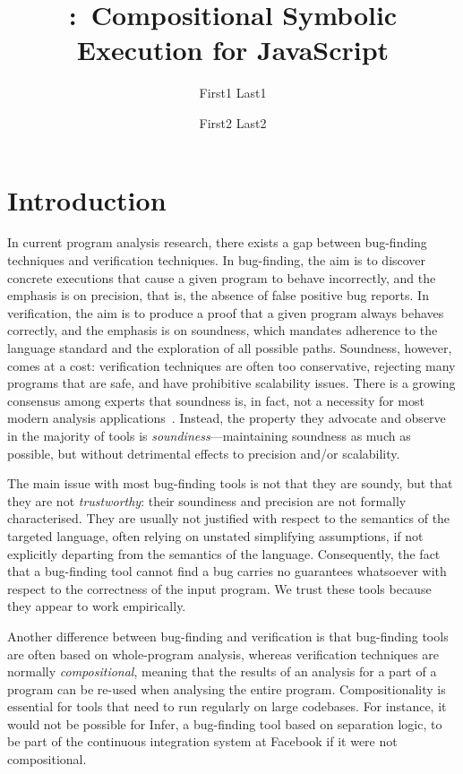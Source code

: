 \documentclass[acmsmall,review,anonymous]{acmart}\settopmatter{printfolios=true,printccs=false,printacmref=false}
\title[Short Title]{\jilette:~Compositional Symbolic Execution for JavaScript}
\author{First1 Last1}
\affiliation{
  \position{Position1}
  \department{Department1}              %
  \institution{Institution1}            %
  \streetaddress{Street1 Address1}
  \city{City1}
  \state{State1}
  \postcode{Post-Code1}
  \country{Country1}                    %
}
\author{First2 Last2}
\affiliation{
  \position{Position2a}
  \department{Department2a}             %
  \institution{Institution2a}           %
  \streetaddress{Street2a Address2a}
  \city{City2a}
  \state{State2a}
  \postcode{Post-Code2a}
  \country{Country2a}                   %
}
\affiliation{
  \position{Position2b}
  \department{Department2b}             %
  \institution{Institution2b}           %
  \streetaddress{Street3b Address2b}
  \city{City2b}
  \state{State2b}
  \postcode{Post-Code2b}
  \country{Country2b}                   %
}
\begin{document}
%

\maketitle 

\section{Introduction}


In current program analysis research, there exists a gap between bug-finding techniques and verification techniques. In bug-finding, the aim is to discover concrete executions that cause a given program to behave incorrectly, and the emphasis is on precision, that is, the absence of false positive bug reports. In verification, the aim is to produce a proof that a given program always behaves correctly, and the emphasis is on soundness, which mandates adherence to the language standard and the exploration of all possible paths. 
%
Soundness, however, comes at a cost: verification techniques are often too conservative, rejecting many programs that are safe, and have prohibitive scalability issues.
%
There is a growing consensus among experts that soundness is, in fact, not a necessity for most modern analysis applications~\cite{.}. Instead, the property they advocate and observe in the  majority of tools is \emph{soundiness}---maintaining soundness as much as possible, but without detrimental effects to precision and/or scalability.

The main issue with most bug-finding tools is not that they are soundy, but that they are not \emph{trustworthy}: their soundiness and precision are not formally characterised. They are usually not justified with respect to the semantics of the targeted language, often relying on unstated simplifying assumptions, if not explicitly departing from the semantics of the language. Consequently, the fact that a bug-finding tool cannot find a bug carries no guarantees whatsoever with respect to the correctness of the input program. We trust these tools because they appear to work empirically.

Another difference between bug-finding and verification is that bug-finding tools are often based on whole-program analysis, whereas verification techniques are normally \emph{compositional}, meaning that the results of an analysis for a part of a program can be re-used when analysing the entire program. Compositionality is essential for tools that need to run regularly on large codebases. For instance, it would not be possible for Infer, a bug-finding tool based on separation logic, to be part of the continuous integration system at Facebook if it were not compositional. 
\end{document}
